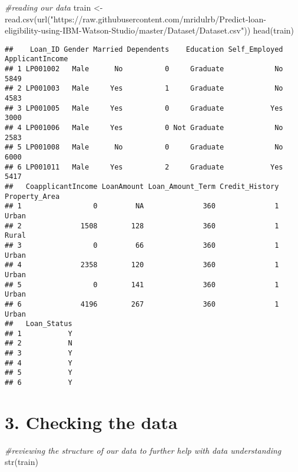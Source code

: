 \documentclass[
]{article}
\newenvironment{Shaded}{\begin{snugshade}}{\end{snugshade}}
\newcommand{\CommentTok}[1]{\textcolor[rgb]{0.56,0.35,0.01}{\textit{#1}}}
\newcommand{\FunctionTok}[1]{\textcolor[rgb]{0.00,0.00,0.00}{#1}}
\newcommand{\NormalTok}[1]{#1}
\newcommand{\OtherTok}[1]{\textcolor[rgb]{0.56,0.35,0.01}{#1}}
\newcommand{\StringTok}[1]{\textcolor[rgb]{0.31,0.60,0.02}{#1}}
\begin{document}
\begin{Shaded}
\begin{Highlighting}[]
\CommentTok{\#reading our data}
\NormalTok{train }\OtherTok{\textless{}{-}} \FunctionTok{read.csv}\NormalTok{(}\FunctionTok{url}\NormalTok{(}\StringTok{"https://raw.githubusercontent.com/mridulrb/Predict{-}loan{-}eligibility{-}using{-}IBM{-}Watson{-}Studio/master/Dataset/Dataset.csv"}\NormalTok{))}
\FunctionTok{head}\NormalTok{(train)}
\end{Highlighting}
\end{Shaded}

\begin{verbatim}
##    Loan_ID Gender Married Dependents    Education Self_Employed ApplicantIncome
## 1 LP001002   Male      No          0     Graduate            No            5849
## 2 LP001003   Male     Yes          1     Graduate            No            4583
## 3 LP001005   Male     Yes          0     Graduate           Yes            3000
## 4 LP001006   Male     Yes          0 Not Graduate            No            2583
## 5 LP001008   Male      No          0     Graduate            No            6000
## 6 LP001011   Male     Yes          2     Graduate           Yes            5417
##   CoapplicantIncome LoanAmount Loan_Amount_Term Credit_History Property_Area
## 1                 0         NA              360              1         Urban
## 2              1508        128              360              1         Rural
## 3                 0         66              360              1         Urban
## 4              2358        120              360              1         Urban
## 5                 0        141              360              1         Urban
## 6              4196        267              360              1         Urban
##   Loan_Status
## 1           Y
## 2           N
## 3           Y
## 4           Y
## 5           Y
## 6           Y
\end{verbatim}

\hypertarget{checking-the-data}{%
\section{3. Checking the data}\label{checking-the-data}}

\begin{Shaded}
\begin{Highlighting}[]
\CommentTok{\#reviewing the structure of our data to further help with data understanding}
\FunctionTok{str}\NormalTok{(train)}
\end{Highlighting}
\end{Shaded}
\end{document}
